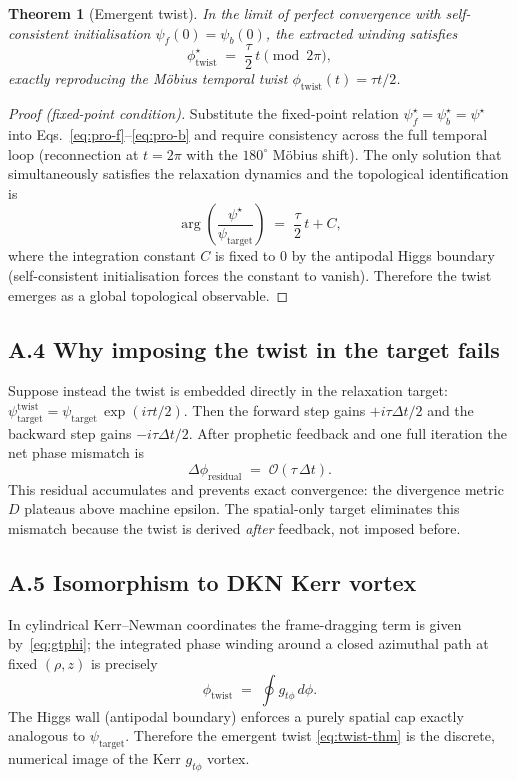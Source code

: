 \documentclass[11pt,a4paper]{article}
\newtheorem{theorem}{Theorem}
\theoremstyle{definition}
\theoremstyle{remark}
\newcommand{\psif}{\psi_{f}}
\newcommand{\psib}{\psi_{b}}
\newcommand{\psit}{\psi_{\mathrm{target}}}
\newcommand{\phitwist}{\phi_{\mathrm{twist}}}
\begin{document}
\begin{theorem}[Emergent twist]\label{thm:emergent-twist}
In the limit of perfect convergence with self-consistent initialisation
$\psif(0) = \psib(0)$, the extracted winding satisfies
\begin{equation}\label{eq:twist-thm}
  \phi_{\mathrm{twist}}^\star
  \;=\; \frac{\tau}{2}\,t \pmod{2\pi},
\end{equation}
exactly reproducing the M\"obius temporal twist
$\phitwist(t) = \tau t/2$.
\end{theorem}

\begin{proof}[Proof (fixed-point condition)]
Substitute the fixed-point relation $\psif^\star = \psib^\star = \psi^\star$
into Eqs.~\eqref{eq:pro-f}--\eqref{eq:pro-b} and require consistency
across the full temporal loop (reconnection at $t = 2\pi$ with the
$180^\circ$ M\"obius shift). The only solution that simultaneously
satisfies the relaxation dynamics and the topological identification is
\begin{equation}\label{eq:arg-linear}
  \arg\!\left(\frac{\psi^\star}{\psit}\right)
  \;=\; \frac{\tau}{2}\,t + C,
\end{equation}
where the integration constant $C$ is fixed to $0$ by the antipodal
Higgs boundary (self-consistent initialisation forces the constant to
vanish). Therefore the twist emerges as a global topological
observable.
\end{proof}

\subsection*{A.4 Why imposing the twist in the target fails}
Suppose instead the twist is embedded directly in the relaxation target:
$\psit^{\mathrm{twist}} = \psit\,\exp(i\tau t/2)$. Then the forward
step gains $+i\tau\Delta t/2$ and the backward step gains
$-i\tau\Delta t/2$. After prophetic feedback and one full iteration the
net phase mismatch is
\begin{equation}
  \Delta\phi_{\mathrm{residual}} \;=\; \mathcal{O}(\tau\,\Delta t).
\end{equation}
This residual accumulates and prevents exact convergence: the divergence
metric $D$ plateaus above machine epsilon. The spatial-only target
eliminates this mismatch because the twist is derived \emph{after}
feedback, not imposed before.

\subsection*{A.5 Isomorphism to DKN Kerr vortex}
In cylindrical Kerr--Newman coordinates the frame-dragging term is
given by~\eqref{eq:gtphi}; the integrated phase winding around a closed
azimuthal path at fixed $(\rho, z)$ is precisely
\begin{equation}
  \phitwist \;=\; \oint g_{t\phi}\,d\phi.
\end{equation}
The Higgs wall (antipodal boundary) enforces a purely spatial cap
exactly analogous to $\psit$. Therefore the emergent twist
\eqref{eq:twist-thm} is the discrete, numerical image of the Kerr
$g_{t\phi}$ vortex.
\end{document}
